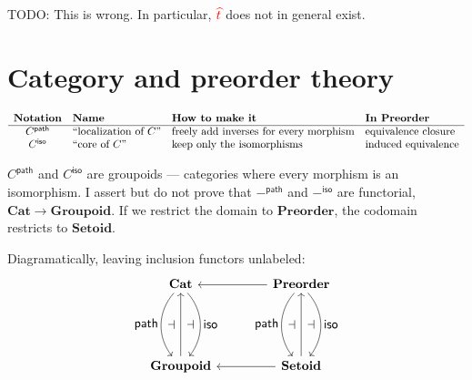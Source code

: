 \documentclass{article}
\newcommand{\todo}[1]{{\color{red}#1}}
\newcommand{\ms}[1]{\ensuremath{\mathsf{#1}}}
\newcommand{\mb}[1]{\ensuremath{\mathbf{#1}}}
\newcommand{\iso}{\ms{iso}}
\renewcommand{\path}{\ms{path}}
\newcommand{\tm}{{\ms{id}}}     %
\newcommand{\tc}{\cdot}         %
\newcommand{\h}[3]{#1 :^{#3}\! {#2}}
\begin{document}
\todo{TODO: This is wrong. In particular, ${\color{red}{\widehat{t}}}$ does not in general exist.}



\section{Category and preorder theory}

\[
\begin{array}{clll}
  \multicolumn{1}{l}{\textbf{Notation}}
  & \multicolumn{1}{l}{\textbf{Name}}
  & \multicolumn{1}{l}{\textbf{How to make it}}
  & \multicolumn{1}{l}{\textbf{In $\mb{Preorder}$}}
  \\\hline
  C^\path
  & \text{``localization of $C$''}
  & \text{freely add inverses for every morphism}
  & \text{equivalence closure}
  \\
  C^\iso
  & \text{``core of $C$''}
  & \text{keep only the isomorphisms}
  & \text{induced equivalence}
\end{array}
\]

$C^\path$ and $C^\iso$ are groupoids --- categories where every morphism is an
isomorphism. I assert but do not prove that $-^\path$ and $-^\iso$ are
functorial, $\mb{Cat} \to \mb{Groupoid}$. If we restrict the domain to
$\mb{Preorder}$, the codomain restricts to $\mb{Setoid}$.

Diagramatically, leaving inclusion functors unlabeled:
{\large\[
  \tikzset{
    no line/.style={draw=none,
      commutative diagrams/every label/.append style={/tikz/auto=false}}}
  \begin{tikzcd}[row sep=5em,column sep=4em]
    \mb{Cat}
    \arrow[d,bend right=40,"\textstyle\path"'{name=A}]
    \arrow[d,bend left=40,"\textstyle\iso"{name=C}]
    & \mb{Preorder}
    \arrow[d,bend right=40,"\textstyle\path"'{name=A2}]
    \arrow[d,bend left=40,"\textstyle\iso"{name=C2}]
    \arrow[l]
    \\
    \mb{Groupoid} \arrow[u,""{name=B}]
    & \mb{Setoid} \arrow{u}[name=B2]{} \arrow[l]
    \arrow[to path={(A) -- (B)\tikztonodes}, no line, near end]{}{\displaystyle\dashv}
    \arrow[to path={(B) -- (C)\tikztonodes}, no line]{}{\displaystyle\dashv}
    \arrow[to path={(A2) -- (B2)\tikztonodes}, no line, near end]{}{\displaystyle\dashv}
    \arrow[to path={(B2) -- (C2)\tikztonodes}, no line]{}{\displaystyle\dashv}
  \end{tikzcd}
\]}
\end{document}
